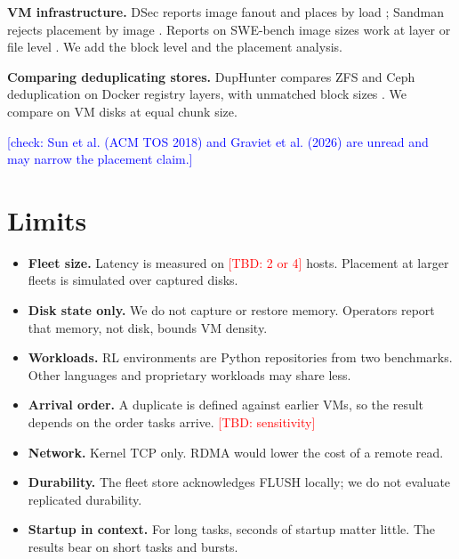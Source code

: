\documentclass[10pt,twocolumn]{article}
\newcommand{\TBD}[1]{\textcolor{red}{[TBD: #1]}}
\newcommand{\chk}[1]{\textcolor{blue}{[check: #1]}}
\begin{document}
\textbf{VM infrastructure.} DSec reports image fanout and places by load \cite{dsec}; Sandman rejects placement by image \cite{sandman}. Reports on SWE-bench image sizes work at layer or file level \cite{epoch-swebench,logicstar}. We add the block level and the placement analysis.

\textbf{Comparing deduplicating stores.} DupHunter compares ZFS and Ceph deduplication on Docker registry layers, with unmatched block sizes \cite{duphunter}. We compare on VM disks at equal chunk size.

\chk{Sun et al. (ACM TOS 2018) and Graviet et al. (2026) are unread and may narrow the placement claim.}

\section{Limits}

\begin{itemize}
\item \textbf{Fleet size.} Latency is measured on \TBD{2 or 4} hosts. Placement at larger fleets is simulated over captured disks.

\item \textbf{Disk state only.} We do not capture or restore memory. Operators report that memory, not disk, bounds VM density.

\item \textbf{Workloads.} RL environments are Python repositories from two benchmarks. Other languages and proprietary workloads may share less.

\item \textbf{Arrival order.} A duplicate is defined against earlier VMs, so the result depends on the order tasks arrive. \TBD{sensitivity}

\item \textbf{Network.} Kernel TCP only. RDMA would lower the cost of a remote read.

\item \textbf{Durability.} The fleet store acknowledges FLUSH locally; we do not evaluate replicated durability.

\item \textbf{Startup in context.} For long tasks, seconds of startup matter little. The results bear on short tasks and bursts.

\end{itemize}



\end{document}
